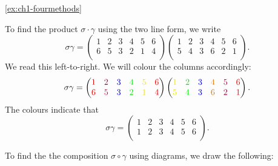 \begin{solution}{\ref{ex:ch1-fourmethods}}
{     To find the product \(\sigma\cdot\gamma\) using the two line form, we write
    \[
    \sigma\gamma = \begin{pmatrix}
        1 & 2 & 3 & 4 & 5 & 6\\
        6 & 5 & 3 & 2 & 1 & 4\\
    \end{pmatrix}\begin{pmatrix}
        1 & 2 & 3 & 4 & 5 & 6\\
        5 & 4 & 3 & 6 & 2 & 1\\
    \end{pmatrix}.
    \]
    We read this left-to-right. We will colour the columns accordingly:
    \[
    \sigma\gamma = \begin{pmatrix}
        \textcolor{red!90!black}{1} & \textcolor{purple!90!black}{2} & \textcolor{blue!90!black}{3} & \textcolor{green!90!black}{4} & \textcolor{yellow!90!black}{5} & \textcolor{red!90!black}{6}\\
        \textcolor{red!90!black}{6} & \textcolor{purple!90!black}{5} & \textcolor{blue!90!black}{3} & \textcolor{green!90!black}{2} & \textcolor{yellow!90!black}{1} & \textcolor{red!90!black}{4}\\
    \end{pmatrix}\begin{pmatrix}
        \textcolor{yellow!90!black}{1} & \textcolor{green!90!black}{2} & \textcolor{blue!90!black}{3} & \textcolor{orange!90!black}{4} & \textcolor{purple!90!black}{5} & \textcolor{red!90!black}{6}\\
        \textcolor{yellow!90!black}{5} & \textcolor{green!90!black}{4} & \textcolor{blue!90!black}{3} & \textcolor{orange!90!black}{6} & \textcolor{purple!90!black}{2} & \textcolor{red!90!black}{1}\\
    \end{pmatrix}.
    \]
    The colours indicate that
    \[
    \sigma\gamma = \begin{pmatrix}
        1 & 2 & 3 & 4 & 5 & 6\\
        1 & 2 & 3 & 4 & 5 & 6\\
    \end{pmatrix}.
    \]

     To find the the composition \(\sigma\circ\gamma\) using diagrams, we draw the following:

    \begin{figure}[h]
        \centering
\end{figure}}
\end{solution}
